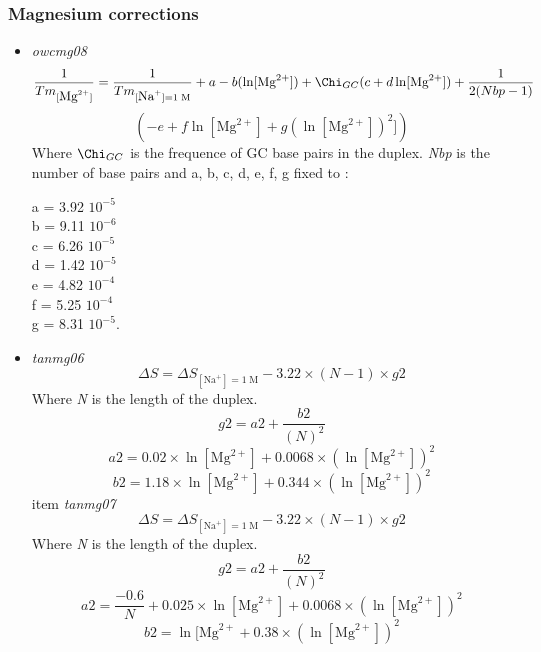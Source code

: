 \documentclass{article}
\begin{document}
\subsubsection{Magnesium corrections}
  \begin{itemize}
  \item \textit{owcmg08}
 \begin{displaymath}
 \frac{1}{Tm_{[\mbox{Mg}^{2+}]}} = \frac{1}{Tm_{[\mbox{Na}^+]=1\;\mathrm{M}}} + a
 - b (\ln [\mbox{Mg}^{2+}]) + \Chi_{GC} (c + d \ln [\mbox{Mg}^{2+}]) + \frac{1}{2 (Nbp-1)} 
 \end{displaymath}
 \begin{displaymath}
 (-e + f \ln [\mbox{Mg}^{2+}] + g (\ln [\mbox{Mg}^{2+}])^{2}])
 \end{displaymath}
 Where \emph{$\Chi_{GC}$} is the frequence of GC base pairs in the duplex.
 \emph{Nbp} is the number of base pairs
 and a, b, c, d, e, f, g fixed to :
 
 a = 3.92 \times $10^{-5}$ \\
 b = 9.11 \times $10^{-6}$ \\
 c = 6.26 \times $10^{-5}$ \\
 d = 1.42 \times $10^{-5}$ \\
 e = 4.82 \times $10^{-4}$ \\
 f = 5.25 \times $10^{-4}$ \\
 g = 8.31 \times $10^{-5}$. \\
 \item \textit{tanmg06}
 \begin{displaymath}
  \Delta{}S=\Delta{}S_{[\mbox{Na}^+]=1\;\mathrm{M}}- 3.22 \times (N - 1) \times g2  
 \end{displaymath}
 Where \emph{N} is the length of the duplex.
 \begin{displaymath}
  g2=a2 + \frac{b2}{(N)^2}  
 \end{displaymath}
 \begin{displaymath}
  a2= 0.02 \times \ln [\mbox{Mg}^{2+}] + 0.0068 \times (\ln [\mbox{Mg}^{2+}])^2  
 \end{displaymath}
 \begin{displaymath}
  b2= 1.18 \times \ln [\mbox{Mg}^{2+}] + 0.344 \times (\ln [\mbox{Mg}^{2+}])^2
 \end{displaymath}
 item \textit{tanmg07}
 \begin{displaymath}
  \Delta{}S=\Delta{}S_{[\mbox{Na}^+]=1\;\mathrm{M}}- 3.22 \times (N - 1) \times g2  
 \end{displaymath}
 Where \emph{N} is the length of the duplex.
 \begin{displaymath}
  g2=a2 + \frac{b2}{(N)^2}  
 \end{displaymath}
 \begin{displaymath}
  a2= \frac{-0.6}{N} + 0.025 \times \ln [\mbox{Mg}^{2+}] + 0.0068 \times (\ln [\mbox{Mg}^{2+}])^2  
 \end{displaymath}
 \begin{displaymath}
  b2= \ln [\mbox{Mg}^{2+} + 0.38 \times (\ln [\mbox{Mg}^{2+}])^2  
 \end{displaymath}
 \end{itemize} 
\end{document}
